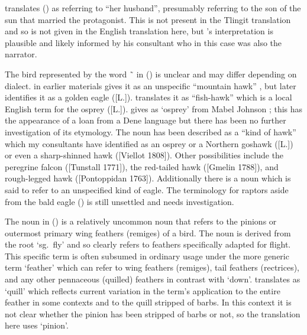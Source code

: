 \citeauthor{swanton:1909} translates (\lastx) as referring to “her husband”, presumably referring to the son of the sun that married the protagonist.
This is not present in the Tlingit translation and so is not given in the English translation here, but \citeauthor{swanton:1909}’s interpretation is plausible and likely informed by his consultant who in this case was also the narrator.

The bird represented by the word  \~\  in (\lastx) is unclear and may differ depending on dialect.
\citeauthor{leer:1973} in earlier materials gives it as an unspecific “mountain hawk” \parencites[10.172]{leer:1973}[48]{leer:1978b}, but later identifies it as a golden eagle ([L.]).
\citeauthor{swanton:1909} translates it as “fish-hawk” which is a local English term for the osprey ([L.]).
\citeauthor{leer:1978b} gives  as ‘osprey’ from Mabel Johnson ; this has the appearance of a loan from a Dene language but there has been no further investigation of its etymology.
The noun  has been described as a “kind of hawk” \parencites[03/24]{leer:1973}[\textsc{m}·138]{leer:2001} which my consultants have identified as an osprey or a Northern goshawk ([L.]) or even a sharp-shinned hawk ([Viellot 1808]).
Other possibilities include the peregrine falcon ([Tunstall 1771]), the red-tailed hawk ([Gmelin 1788]), and rough-legged hawk ([Pontoppidan 1763]).
Additionally there is a noun  which is said to refer to an unspecified kind of eagle.
The terminology for raptors aside from the bald eagle () is still unsettled and needs investigation.

The noun  in (\lastx) is a relatively uncommon noun that refers to the pinions or outermost primary wing feathers (remiges) of a bird.
The noun is derived from the root  ‘sg.\ fly’ and so clearly refers to feathers specifically adapted for flight.
This specific term is often subsumed in ordinary usage under the more generic term  ‘feather’ which can refer to wing feathers (remiges), tail feathers (rectrices), and any other pennaceous (quilled) feathers in contrast with  ‘down’.
\citeauthor{swanton:1909} translates  as ‘quill’ which reflects current variation in the term’s application to the entire feather in some contexts and to the quill stripped of barbs.
In this context it is not clear whether the pinion has been stripped of barbs or not, so the translation here uses ‘pinion’.

